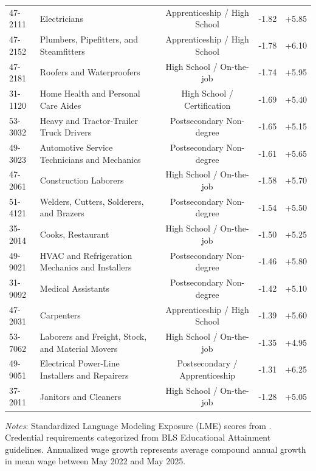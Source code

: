 \documentclass[12pt]{article}
\begin{document}
\begin{table}[htbp]
{\begin{tabular}{llccc}
47-2111 & Electricians & Apprenticeship / High School & -1.82 & +5.85 \\
47-2152 & Plumbers, Pipefitters, and Steamfitters & Apprenticeship / High School & -1.78 & +6.10 \\
47-2181 & Roofers and Waterproofers & High School / On-the-job & -1.74 & +5.95 \\
31-1120 & Home Health and Personal Care Aides & High School / Certification & -1.69 & +5.40 \\
53-3032 & Heavy and Tractor-Trailer Truck Drivers & Postsecondary Non-degree & -1.65 & +5.15 \\
49-3023 & Automotive Service Technicians and Mechanics & Postsecondary Non-degree & -1.61 & +5.65 \\
47-2061 & Construction Laborers & High School / On-the-job & -1.58 & +5.70 \\
51-4121 & Welders, Cutters, Solderers, and Brazers & Postsecondary Non-degree & -1.54 & +5.50 \\
35-2014 & Cooks, Restaurant & High School / On-the-job & -1.50 & +5.25 \\
49-9021 & HVAC and Refrigeration Mechanics and Installers & Postsecondary Non-degree & -1.46 & +5.80 \\
31-9092 & Medical Assistants & Postsecondary Non-degree & -1.42 & +5.10 \\
47-2031 & Carpenters & Apprenticeship / High School & -1.39 & +5.60 \\
53-7062 & Laborers and Freight, Stock, and Material Movers & High School / On-the-job & -1.35 & +4.95 \\
49-9051 & Electrical Power-Line Installers and Repairers & Postsecondary / Apprenticeship & -1.31 & +6.25 \\
37-2011 & Janitors and Cleaners & High School / On-the-job & -1.28 & +5.05 \\
\bottomrule
\end{tabular}%
}
\par\vspace{6pt}
\begin{minipage}{\linewidth}
\footnotesize
\textit{Notes}: Standardized Language Modeling Exposure (LME) scores from \citet{felten2023}. Credential requirements categorized from BLS Educational Attainment guidelines. Annualized wage growth represents average compound annual growth in mean wage between May 2022 and May 2025.
\end{minipage}
\end{table}
\end{document}
